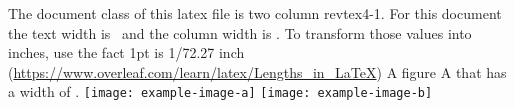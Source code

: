 \documentclass[twocolumn, prl]{revtex4-1}
\begin{document}
The document class of this latex file is two column revtex4-1. For this document the text width is \the\textwidth~and the column width is \the\columnwidth. To transform those values into inches, use the fact 1pt is 1/72.27 inch (\url{https://www.overleaf.com/learn/latex/Lengths_in_LaTeX})
A figure A that has a width of \the\columnwidth.
\texttt{[image: example-image-a]}
\texttt{[image: example-image-b]}
\end{document}

